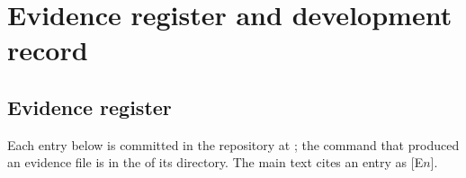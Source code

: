 \section{Evidence register and development record}\label{app:record}
\subsection{Evidence register}\label{app:register}
Each entry below is committed in the repository at \repourl; the command that produced an evidence file is in the  of its directory. The main text cites an entry as [E$n$].

